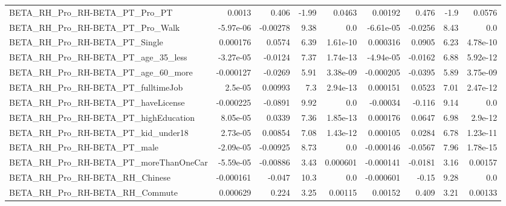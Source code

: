 \begin{tabular}{lrrrrrrrr}
BETA\_RH\_Pro\_RH-BETA\_PT\_Pro\_PT                      &      0.0013 &        0.406 &     -1.99 &   0.0463 &    0.00192 &       0.476 &         -1.9 &        0.0576 \\
BETA\_RH\_Pro\_RH-BETA\_PT\_Pro\_Walk                    &   -5.97e-06 &     -0.00278 &      9.38 &      0.0 &  -6.61e-05 &     -0.0256 &         8.43 &           0.0 \\
BETA\_RH\_Pro\_RH-BETA\_PT\_Single                      &    0.000176 &       0.0574 &      6.39 & 1.61e-10 &   0.000316 &      0.0905 &         6.23 &      4.78e-10 \\
BETA\_RH\_Pro\_RH-BETA\_PT\_age\_35\_less                 &   -3.27e-05 &      -0.0124 &      7.37 & 1.74e-13 &  -4.94e-05 &     -0.0162 &         6.88 &      5.92e-12 \\
BETA\_RH\_Pro\_RH-BETA\_PT\_age\_60\_more                 &   -0.000127 &      -0.0269 &      5.91 & 3.38e-09 &  -0.000205 &     -0.0395 &         5.89 &      3.75e-09 \\
BETA\_RH\_Pro\_RH-BETA\_PT\_fulltimeJob                 &     2.5e-05 &      0.00993 &       7.3 & 2.94e-13 &   0.000151 &      0.0523 &         7.01 &      2.47e-12 \\
BETA\_RH\_Pro\_RH-BETA\_PT\_haveLicense                 &   -0.000225 &      -0.0891 &      9.92 &      0.0 &   -0.00034 &      -0.116 &         9.14 &           0.0 \\
BETA\_RH\_Pro\_RH-BETA\_PT\_highEducation               &    8.05e-05 &       0.0339 &      7.36 & 1.85e-13 &   0.000176 &      0.0647 &         6.98 &       2.9e-12 \\
BETA\_RH\_Pro\_RH-BETA\_PT\_kid\_under18                 &    2.73e-05 &      0.00854 &      7.08 & 1.43e-12 &   0.000105 &      0.0284 &         6.78 &      1.23e-11 \\
BETA\_RH\_Pro\_RH-BETA\_PT\_male                        &   -2.09e-05 &     -0.00925 &      8.73 &      0.0 &  -0.000146 &     -0.0567 &         7.96 &      1.78e-15 \\
BETA\_RH\_Pro\_RH-BETA\_PT\_moreThanOneCar              &   -5.59e-05 &     -0.00886 &      3.43 & 0.000601 &  -0.000141 &     -0.0181 &         3.16 &       0.00157 \\
BETA\_RH\_Pro\_RH-BETA\_RH\_Chinese                     &   -0.000161 &       -0.047 &      10.3 &      0.0 &  -0.000601 &       -0.15 &         9.28 &           0.0 \\
BETA\_RH\_Pro\_RH-BETA\_RH\_Commute                     &    0.000629 &        0.224 &      3.25 &  0.00115 &    0.00152 &       0.409 &         3.21 &       0.00133 \\

\end{tabular}
